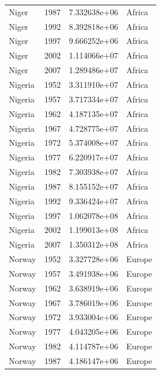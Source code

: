 \documentclass[
  letterpaper,
  DIV=11,
  numbers=noendperiod]{scrreprt}
\begin{document}
\begin{tcolorbox}
\begin{tabular}{lrrl}
Niger                    &  1987 &  7.332638e+06 &    Africa \\
Niger                    &  1992 &  8.392818e+06 &    Africa \\
Niger                    &  1997 &  9.666252e+06 &    Africa \\
Niger                    &  2002 &  1.114066e+07 &    Africa \\
Niger                    &  2007 &  1.289486e+07 &    Africa \\
Nigeria                  &  1952 &  3.311910e+07 &    Africa \\
Nigeria                  &  1957 &  3.717334e+07 &    Africa \\
Nigeria                  &  1962 &  4.187135e+07 &    Africa \\
Nigeria                  &  1967 &  4.728775e+07 &    Africa \\
Nigeria                  &  1972 &  5.374008e+07 &    Africa \\
Nigeria                  &  1977 &  6.220917e+07 &    Africa \\
Nigeria                  &  1982 &  7.303938e+07 &    Africa \\
Nigeria                  &  1987 &  8.155152e+07 &    Africa \\
Nigeria                  &  1992 &  9.336424e+07 &    Africa \\
Nigeria                  &  1997 &  1.062078e+08 &    Africa \\
Nigeria                  &  2002 &  1.199013e+08 &    Africa \\
Nigeria                  &  2007 &  1.350312e+08 &    Africa \\
Norway                   &  1952 &  3.327728e+06 &    Europe \\
Norway                   &  1957 &  3.491938e+06 &    Europe \\
Norway                   &  1962 &  3.638919e+06 &    Europe \\
Norway                   &  1967 &  3.786019e+06 &    Europe \\
Norway                   &  1972 &  3.933004e+06 &    Europe \\
Norway                   &  1977 &  4.043205e+06 &    Europe \\
Norway                   &  1982 &  4.114787e+06 &    Europe \\
Norway                   &  1987 &  4.186147e+06 &    Europe \\

\end{tabular}
\end{tcolorbox}
\end{document}
